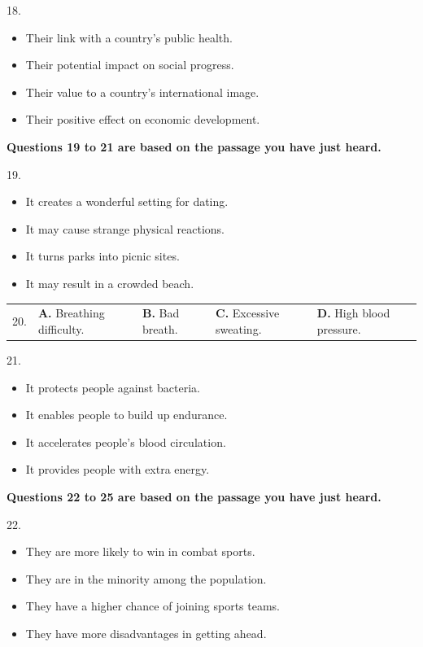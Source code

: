 \documentclass[UTF8,11pt]{ctexart}
\begin{document}
18.


\begin{itemize}[leftmargin=2em,itemsep=.2em,topsep=.4em]\item[A.] Their link with a country's public health.
\item[B.] Their potential impact on social progress.
\item[C.] Their value to a country's international image.
\item[D.] Their positive effect on economic development.
\end{itemize}

\textbf{Questions 19 to 21 are based on the passage you have just heard.}


19.


\begin{itemize}[leftmargin=2em,itemsep=.2em,topsep=.4em]\item[A.] It creates a wonderful setting for dating.
\item[B.] It may cause strange physical reactions.
\item[C.] It turns parks into picnic sites.
\item[D.] It may result in a crowded beach.
\end{itemize}

\noindent\begin{tabularx}{\linewidth}{@{}lXXXX@{}}20. & \textbf{A.} Breathing difficulty. & \textbf{B.} Bad breath. & \textbf{C.} Excessive sweating. & \textbf{D.} High blood pressure.\\\end{tabularx}\par

21.


\begin{itemize}[leftmargin=2em,itemsep=.2em,topsep=.4em]\item[A.] It protects people against bacteria.
\item[B.] It enables people to build up endurance.
\item[C.] It accelerates people's blood circulation.
\item[D.] It provides people with extra energy.
\end{itemize}

\textbf{Questions 22 to 25 are based on the passage you have just heard.}


22.


\begin{itemize}[leftmargin=2em,itemsep=.2em,topsep=.4em]\item[A.] They are more likely to win in combat sports.
\item[B.] They are in the minority among the population.
\item[C.] They have a higher chance of joining sports teams.
\item[D.] They have more disadvantages in getting ahead.
\end{itemize}
\end{document}
